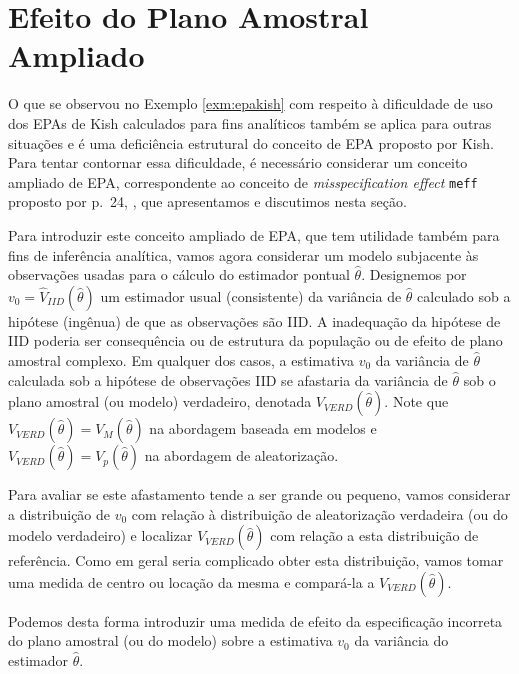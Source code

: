 \documentclass[]{book}
\theoremstyle{definition}
\theoremstyle{definition}
\theoremstyle{definition}
\theoremstyle{remark}
\begin{document}
\section{Efeito do Plano Amostral
Ampliado}\label{efeito-do-plano-amostral-ampliado}

O que se observou no Exemplo \ref{exm:epakish} com respeito à
dificuldade de uso dos EPAs de Kish calculados para fins analíticos
também se aplica para outras situações e é uma deficiência estrutural do
conceito de EPA proposto por Kish. Para tentar contornar essa
dificuldade, é necessário considerar um conceito ampliado de EPA,
correspondente ao conceito de \emph{misspecification effect}
\texttt{meff} proposto por p.~24, \citep{SHS89}, que apresentamos e
discutimos nesta seção.

Para introduzir este conceito ampliado de EPA, que tem utilidade também
para fins de inferência analítica, vamos agora considerar um modelo
subjacente às observações usadas para o cálculo do estimador pontual
\(\hat{\theta}\). Designemos por
\(v_{0}=\widehat{V}_{IID}\left( \hat{\theta}\right)\) um estimador usual
(consistente) da variância de \(\hat{\theta}\) calculado sob a hipótese
(ingênua) de que as observações são IID. A inadequação da hipótese de
IID poderia ser consequência ou de estrutura da população ou de efeito
de plano amostral complexo. Em qualquer dos casos, a estimativa
\(v_{0}\) da variância de \(\hat{\theta}\) calculada sob a hipótese de
observações IID se afastaria da variância de \(\hat{\theta}\) sob o
plano amostral (ou modelo) verdadeiro, denotada
\(V_{VERD}\left( \hat{\theta}\right)\). Note que
\(V_{VERD}\left( \hat{\theta}\right) =V_{M}\left( \hat{\theta}\right)\)
na abordagem baseada em modelos e
\(V_{VERD}\left( \hat{\theta}\right) =V_{p}\left( \hat{\theta}\right)\)
na abordagem de aleatorização.

Para avaliar se este afastamento tende a ser grande ou pequeno, vamos
considerar a distribuição de \(v_{0}\) com relação à distribuição de
aleatorização verdadeira (ou do modelo verdadeiro) e localizar
\(V_{VERD}\left( \hat{\theta}\right)\) com relação a esta distribuição
de referência. Como em geral seria complicado obter esta distribuição,
vamos tomar uma medida de centro ou locação da mesma e compará-la a
\(V_{VERD}\left(\hat{\theta}\right)\).

Podemos desta forma introduzir uma medida de efeito da especificação
incorreta do plano amostral (ou do modelo) sobre a estimativa \(v_{0}\)
da variância do estimador \(\hat{\theta}\).
\end{document}
